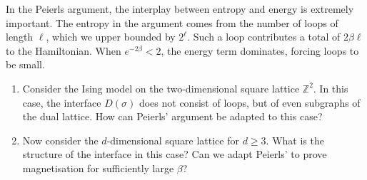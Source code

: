 \begin{remark}
    In the Peierls argument,
    the interplay between entropy and energy is extremely important.
    The entropy in the argument comes from the number of loops of length
    $\ell$, which we upper bounded by $2^\ell$.
    Such a loop contributes a total of $2\beta\ell$ to the Hamiltonian.
    When $e^{-2\beta}<2$, the energy term dominates,
    forcing loops to be small.
\end{remark}

\begin{exercise}
    \begin{enumerate}
        \item     Consider the Ising model on the two-dimensional square lattice $\mathbb{Z}^2$.
        In this case, the interface $D(\sigma)$ does not consist of loops, but of even subgraphs
        of the dual lattice.
        How can Peierls' argument be adapted to this case?
        \item  Now consider the $d$-dimensional square lattice for $d\geq 3$.
        What is the structure of the interface in this case?
        Can we adapt Peierls' to prove magnetisation for sufficiently large $\beta$?
    \end{enumerate}
\end{exercise}






